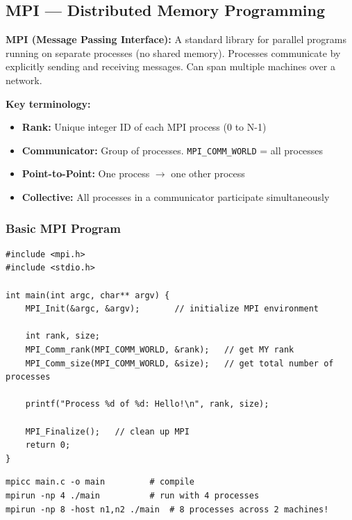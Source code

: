 \documentclass[11pt,a4paper]{article}
\newcommand{\code}[1]{\texttt{\small\colorbox{codebg}{\color{codekw}#1}}}
\newcommand{\term}[1]{\textbf{\color{darkblue}#1}}
\begin{document}
\subsection{MPI --- Distributed Memory Programming}

\begin{mydef}
\textbf{MPI (Message Passing Interface):} A standard library for parallel programs running on separate processes (no shared memory). Processes communicate by explicitly sending and receiving messages. Can span multiple machines over a network.
\end{mydef}

\textbf{Key terminology:}
\begin{itemize}[noitemsep]
  \item \term{Rank:} Unique integer ID of each MPI process (0 to N-1)
  \item \term{Communicator:} Group of processes. \code{MPI\_COMM\_WORLD} = all processes
  \item \term{Point-to-Point:} One process $\to$ one other process
  \item \term{Collective:} All processes in a communicator participate simultaneously
\end{itemize}

\subsubsection{Basic MPI Program}

\begin{lstlisting}
#include <mpi.h>
#include <stdio.h>

int main(int argc, char** argv) {
    MPI_Init(&argc, &argv);       // initialize MPI environment

    int rank, size;
    MPI_Comm_rank(MPI_COMM_WORLD, &rank);   // get MY rank
    MPI_Comm_size(MPI_COMM_WORLD, &size);   // get total number of processes

    printf("Process %d of %d: Hello!\n", rank, size);

    MPI_Finalize();   // clean up MPI
    return 0;
}
\end{lstlisting}
\begin{lstlisting}[style=bashstyle]
mpicc main.c -o main         # compile
mpirun -np 4 ./main          # run with 4 processes
mpirun -np 8 -host n1,n2 ./main  # 8 processes across 2 machines!
\end{lstlisting}
\end{document}
